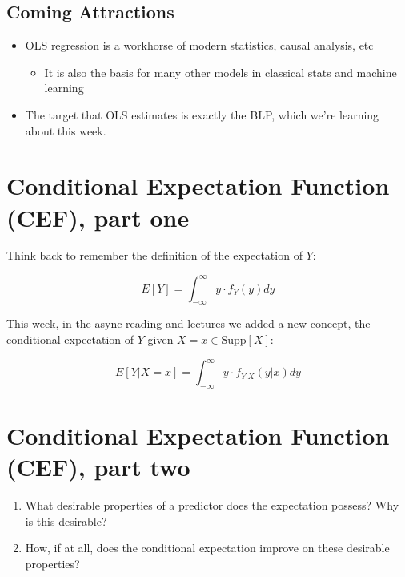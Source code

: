 \documentclass[
]{book}
\providecommand{\tightlist}{%
  \setlength{\itemsep}{0pt}\setlength{\parskip}{0pt}}
\theoremstyle{definition}
\theoremstyle{definition}
\theoremstyle{definition}
\theoremstyle{definition}
\theoremstyle{remark}
\begin{document}
\hypertarget{coming-attractions}{%
\subsection{Coming Attractions}\label{coming-attractions}}

\begin{itemize}
\tightlist
\item
  OLS regression is a workhorse of modern statistics, causal analysis, etc

  \begin{itemize}
  \tightlist
  \item
    It is also the basis for many other models in classical stats and machine learning
  \end{itemize}
\item
  The target that OLS estimates is exactly the BLP, which we're learning about this week.
\end{itemize}

\hypertarget{conditional-expectation-function-cef-part-one}{%
\section{Conditional Expectation Function (CEF), part one}\label{conditional-expectation-function-cef-part-one}}

Think back to remember the definition of the expectation of \(Y\):

\[
  E[Y] = \int_{-\infty}^\infty y \cdot f_{Y}(y) dy
\]

This week, in the async reading and lectures we added a new concept, the conditional expectation of \(Y\) given \(X=x \in \text{Supp}[X]\):

\[
  E[Y|X=x] =  \int_{-\infty}^\infty y \cdot f_{Y|X}(y|x) dy
\]

\hypertarget{conditional-expectation-function-cef-part-two}{%
\section{Conditional Expectation Function (CEF), part two}\label{conditional-expectation-function-cef-part-two}}

\begin{enumerate}
\def\labelenumi{\arabic{enumi}.}
\tightlist
\item
  What desirable properties of a predictor does the expectation possess? Why is this desirable?
\item
  How, if at all, does the conditional expectation improve on these desirable properties?
\end{enumerate}
\end{document}
